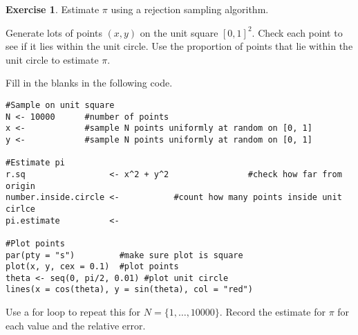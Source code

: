 \documentclass[
]{book}
\theoremstyle{definition}
\theoremstyle{definition}
\theoremstyle{definition}
\newtheorem{exercise}{Exercise}[chapter]
\theoremstyle{definition}
\theoremstyle{remark}
\begin{document}
\begin{exercise}
Estimate \(\pi\) using a rejection sampling algorithm.

Generate lots of points \((x, y)\) on the unit square \([0, 1]^2\). Check each point to see if it lies within the unit circle. Use the proportion of points that lie within the unit circle to estimate \(\pi\).

Fill in the blanks in the following code.

\begin{verbatim}
#Sample on unit square
N <- 10000      #number of points
x <-            #sample N points uniformly at random on [0, 1]
y <-            #sample N points uniformly at random on [0, 1]

#Estimate pi
r.sq                 <- x^2 + y^2                #check how far from origin
number.inside.circle <-           #count how many points inside unit cirlce
pi.estimate          <- 

#Plot points
par(pty = "s")         #make sure plot is square
plot(x, y, cex = 0.1)  #plot points
theta <- seq(0, pi/2, 0.01) #plot unit circle
lines(x = cos(theta), y = sin(theta), col = "red")
\end{verbatim}

Use a for loop to repeat this for \(N = \{1, \ldots, 10000\}\). Record the estimate for \(\pi\) for each value and the relative error.
\end{exercise}
\end{document}
